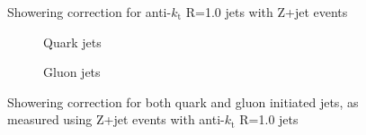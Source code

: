 \clearpage
\begin{figure}[!ht]
 \centering
 \caption[Showering correction for anti-$k_{\mathrm t}$ R=1.0 jets with Z+jet events]
 {\small Showering correction for anti-$k_{\mathrm t}$ R=1.0 jets with Z+jet events}
 \label{plot:ZJetShowering10App}
\end{figure}

\begin{figure}[!ht]
 \centering
 \begin{subfigure}{.5\textwidth}
  \centering
  \caption{Quark jets}
 \end{subfigure}%
 \begin{subfigure}{.5\textwidth}
  \centering
  \caption{Gluon jets}
 \end{subfigure}
 \caption[Quark/gluon jet showering correction, anti-$k_{\mathrm t}$ R=1.0, Z+jet]
 {\small Showering correction for both quark and gluon initiated jets, as measured using Z+jet events with anti-$k_{\mathrm t}$ R=1.0 jets}
 \label{plot:ZJetShoweringFlav10App}
\end{figure}
